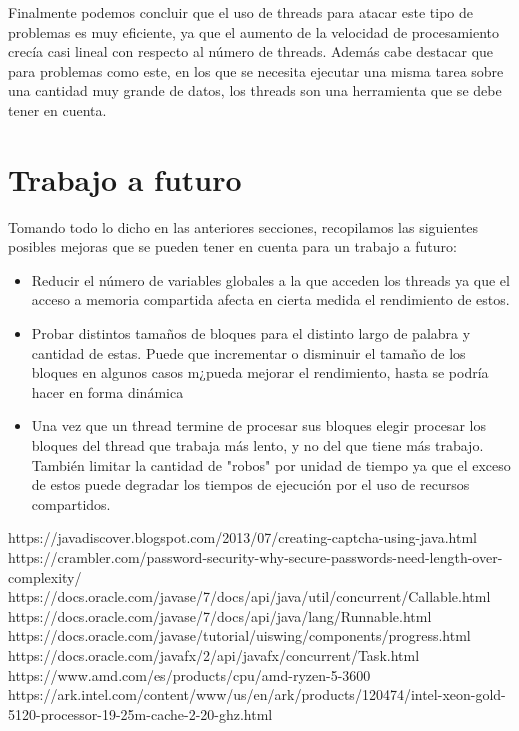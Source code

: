 \documentclass[conference]{IEEEtran}
\begin{document}
Finalmente podemos concluir que el uso de threads para atacar este tipo de problemas es muy eficiente, ya que el aumento de la velocidad de procesamiento crecía casi lineal con respecto al número de threads. Además cabe destacar que para problemas como este, en los que se necesita ejecutar una misma tarea sobre una cantidad muy grande de datos, los threads son una herramienta que se debe tener en cuenta.  

\section{Trabajo a futuro}
Tomando todo lo dicho en las anteriores secciones, recopilamos las siguientes posibles mejoras que se pueden tener en cuenta para un trabajo a futuro:
\begin{itemize}
    \item Reducir el número de variables globales a la que acceden los threads ya que el acceso a memoria compartida afecta en cierta medida el rendimiento de estos.
    \item Probar distintos tamaños de bloques para el distinto largo de palabra y cantidad de estas. Puede que incrementar o disminuir el tamaño de los bloques en algunos casos m¿pueda mejorar el rendimiento, hasta se podría hacer en forma dinámica
    \item Una vez que un thread termine de procesar sus bloques elegir procesar los bloques del thread que trabaja más lento, y no del que tiene más trabajo. También limitar la cantidad de "robos" por unidad de tiempo ya que el exceso de estos puede degradar los tiempos de ejecución por el uso de recursos compartidos. 
\end{itemize}

\begin{thebibliography}{00}
 https://javadiscover.blogspot.com/2013/07/creating-captcha-using-java.html
 https://crambler.com/password-security-why-secure-passwords-need-length-over-complexity/
https://docs.oracle.com/javase/7/docs/api/java/util/concurrent/Callable.html
 https://docs.oracle.com/javase/7/docs/api/java/lang/Runnable.html
 https://docs.oracle.com/javase/tutorial/uiswing/components/progress.html
 https://docs.oracle.com/javafx/2/api/javafx/concurrent/Task.html
 https://www.amd.com/es/products/cpu/amd-ryzen-5-3600
 https://ark.intel.com/content/www/us/en/ark/products/120474/intel-xeon-gold-5120-processor-19-25m-cache-2-20-ghz.html
\end{thebibliography}
\vspace{12pt}
\end{document}
